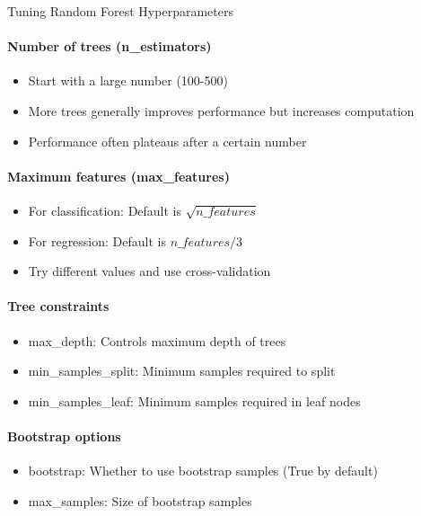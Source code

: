\begin{KR}{Tuning Random Forest Hyperparameters}
\paragraph{Number of trees (n\_estimators)}
\begin{itemize}
    \item Start with a large number (100-500)
    \item More trees generally improves performance but increases computation
    \item Performance often plateaus after a certain number
\end{itemize}

\paragraph{Maximum features (max\_features)}
\begin{itemize}
    \item For classification: Default is $\sqrt{n\_features}$
    \item For regression: Default is $n\_features/3$
    \item Try different values and use cross-validation
\end{itemize}

\paragraph{Tree constraints}
\begin{itemize}
    \item max\_depth: Controls maximum depth of trees
    \item min\_samples\_split: Minimum samples required to split
    \item min\_samples\_leaf: Minimum samples required in leaf nodes
\end{itemize}

\paragraph{Bootstrap options}
\begin{itemize}
    \item bootstrap: Whether to use bootstrap samples (True by default)
    \item max\_samples: Size of bootstrap samples
\end{itemize}
\end{KR}

